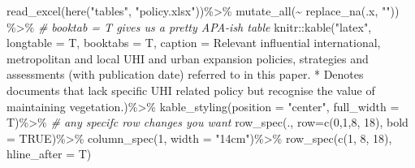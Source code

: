\documentclass[
  12pt,
  oneside]{book}
\newenvironment{Shaded}{\begin{snugshade}}{\end{snugshade}}
\newcommand{\AttributeTok}[1]{\textcolor[rgb]{0.77,0.63,0.00}{#1}}
\newcommand{\CommentTok}[1]{\textcolor[rgb]{0.56,0.35,0.01}{\textit{#1}}}
\newcommand{\ConstantTok}[1]{\textcolor[rgb]{0.00,0.00,0.00}{#1}}
\newcommand{\DecValTok}[1]{\textcolor[rgb]{0.00,0.00,0.81}{#1}}
\newcommand{\FunctionTok}[1]{\textcolor[rgb]{0.00,0.00,0.00}{#1}}
\newcommand{\NormalTok}[1]{#1}
\newcommand{\SpecialCharTok}[1]{\textcolor[rgb]{0.00,0.00,0.00}{#1}}
\newcommand{\StringTok}[1]{\textcolor[rgb]{0.31,0.60,0.02}{#1}}
\begin{document}
\begin{Shaded}
\begin{Highlighting}[]
\FunctionTok{read\_excel}\NormalTok{(}\FunctionTok{here}\NormalTok{(}\StringTok{"tables"}\NormalTok{, }\StringTok{"policy.xlsx"}\NormalTok{))}\SpecialCharTok{\%\textgreater{}\%}
  \FunctionTok{mutate\_all}\NormalTok{(}\SpecialCharTok{\textasciitilde{}} \FunctionTok{replace\_na}\NormalTok{(.x, }\StringTok{""}\NormalTok{)) }\SpecialCharTok{\%\textgreater{}\%}
  \CommentTok{\# booktab = T gives us a pretty APA{-}ish table}
\NormalTok{  knitr}\SpecialCharTok{::}\FunctionTok{kable}\NormalTok{(}\StringTok{"latex"}\NormalTok{, }\AttributeTok{longtable =}\NormalTok{ T, }\AttributeTok{booktabs =}\NormalTok{ T, }
               \AttributeTok{caption =} \StringTok{\textquotesingle{}Relevant influential international, metropolitan and local UHI and urban expansion policies, strategies and assessments (with publication date) referred to in this paper. * Denotes documents that lack specific UHI related policy but recognise the value of maintaining vegetation.\textquotesingle{}}\NormalTok{)}\SpecialCharTok{\%\textgreater{}\%} 
  \FunctionTok{kable\_styling}\NormalTok{(}\AttributeTok{position =} \StringTok{"center"}\NormalTok{, }\AttributeTok{full\_width =}\NormalTok{ T)}\SpecialCharTok{\%\textgreater{}\%}
  \CommentTok{\# any specifc row changes you want}
    \FunctionTok{row\_spec}\NormalTok{(.,}
  \AttributeTok{row=}\FunctionTok{c}\NormalTok{(}\DecValTok{0}\NormalTok{,}\DecValTok{1}\NormalTok{,}\DecValTok{8}\NormalTok{, }\DecValTok{18}\NormalTok{),}
  \AttributeTok{bold =} \ConstantTok{TRUE}\NormalTok{)}\SpecialCharTok{\%\textgreater{}\%}
  \FunctionTok{column\_spec}\NormalTok{(}\DecValTok{1}\NormalTok{, }\AttributeTok{width =} \StringTok{"14cm"}\NormalTok{)}\SpecialCharTok{\%\textgreater{}\%}
  \FunctionTok{row\_spec}\NormalTok{(}\FunctionTok{c}\NormalTok{(}\DecValTok{1}\NormalTok{, }\DecValTok{8}\NormalTok{, }\DecValTok{18}\NormalTok{), }\AttributeTok{hline\_after =}\NormalTok{ T)}
\end{Highlighting}
\end{Shaded}
\end{document}
